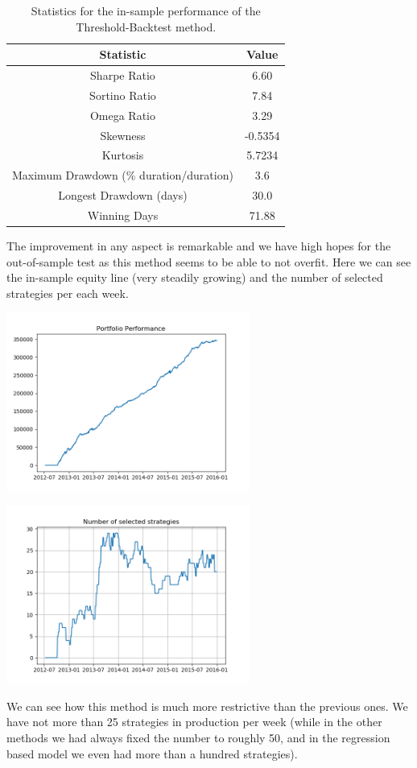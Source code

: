 \begin{table}
	\centering
	\begin{tabular}{c|c}
		\textbf{Statistic} & \textbf{Value} \\\hline
		Sharpe Ratio & 6.60 \\ 
		Sortino Ratio & 7.84 \\ 
		Omega Ratio & 3.29 \\ 
		Skewness & -0.5354 \\ 
		Kurtosis & 5.7234 \\ 
		Maximum Drawdown (\% duration/duration) & 3.6 \\ 
		Longest Drawdown (days) & 30.0 \\ 
		Winning Days & 71.88 \\ 
	\end{tabular}
	\caption{\label{tab:widgets} Statistics for the in-sample performance of the Threshold-Backtest method.}
\end{table}

The improvement in any aspect is remarkable and we have high hopes for the out-of-sample test as this method seems to be able to not overfit.
Here we can see the in-sample equity line (very steadily growing) and the number of selected strategies per each week.

\begin{center}
	\centering
	\includegraphics[width=0.6\textwidth]{GridSearches/Threshold_Backtest/In_sample_perf.png}
	\label{Average_Drawdown_in_sample}
\end{center}


\begin{center}
	\centering
	\includegraphics[width=0.6\textwidth]{GridSearches/Threshold_Backtest/num_strats_in_sample.png}
	\label{Average_Drawdown_in_sample}
\end{center}

We can see how this method is much more restrictive than the previous ones. We have not more than 25 strategies in production per week (while in the other methods we had always fixed the number to roughly 50, and in the regression based model we even had more than a hundred strategies).
